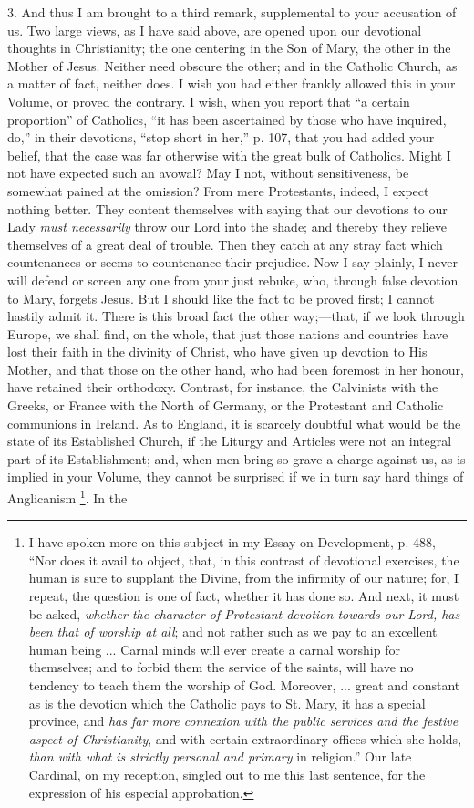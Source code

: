 3. And thus I am brought to a third remark, supplemental to your
accusation of us. Two large views, as I have said above, are opened upon
our devotional thoughts in Christianity; the one centering in the Son of
Mary, the other in the Mother of Jesus. Neither need obscure the other;
and in the Catholic Church, as a matter of fact, neither does. I wish
you had either frankly allowed this in your Volume, or proved the
contrary. I wish, when you report that ``a certain proportion''
of Catholics, ``it has been ascertained by those who have
inquired, do,'' in their devotions, ``stop short in her,''
p. 107, that you had added your belief, that the case was far otherwise
with the great bulk of Catholics. Might I not have expected such an
avowal? May I not, without sensitiveness, be somewhat pained at the
omission? From mere Protestants, indeed, I expect nothing better. They
content themselves with saying that our devotions to our Lady \emph{must
necessarily} throw our Lord into the shade; and thereby they relieve
themselves of a great deal of trouble. Then they catch at any stray fact
which countenances or seems to countenance their prejudice. Now I say
plainly, I never will defend or screen any one from your just rebuke,
who, through false devotion to Mary, forgets Jesus. But I should like
the fact to be proved first; I cannot hastily admit it. There is this
broad fact the other way;—that, if we look through Europe, we shall
find, on the whole, that just those nations and countries have lost
their faith in the divinity of Christ, who have given up devotion to His
Mother, and that those on the other hand, who had been foremost in her
honour, have retained their orthodoxy. Contrast, for instance, the
Calvinists with the Greeks, or France with the North of Germany, or the
Protestant and Catholic communions in Ireland. As to England, it is
scarcely doubtful what would be the state of its Established Church, if
the Liturgy and Articles were not an integral part of its Establishment;
and, when men bring so grave a charge against us, as is implied in your
Volume, they cannot be surprised if we in turn say hard things of
Anglicanism \footnote{I have spoken
more on this subject in my Essay on
Development, p. 488, ``Nor does
it avail to object, that, in this contrast of devotional exercises, the
human is sure to supplant the Divine, from the infirmity of our nature;
for, I repeat, the question is one of fact, whether it has done so. And
next, it must be asked, \emph{whether the character of Protestant devotion
towards our Lord, has been that of worship at all}; and not rather
such as we pay to an excellent human being ... Carnal minds will ever
create a carnal worship for themselves; and to forbid them the service
of the saints, will have no tendency to teach them the worship of God.
Moreover, ... great and constant as is the devotion which the Catholic
pays to St. Mary, it has a special province, and \emph{has far more
connexion with the public services and the festive aspect of
Christianity}, and with certain extraordinary offices which she
holds, \emph{than with what is strictly personal and primary} in
religion.'' Our late Cardinal, on my reception, singled out to me
this last sentence, for the expression of his especial approbation.}. In the
